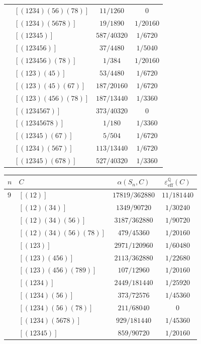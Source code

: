 \documentclass[12pt]{amsart}
\theoremstyle{definition} \newtheorem{definition}[theorem]{Definition}
\theoremstyle{example} \newtheorem{example}[theorem]{Example}
\theoremstyle{remark} \newtheorem{remark}{Remark}[theorem]
\numberwithin{equation}{section}
\numberwithin{theorem}{section}
\renewcommand{\epsilon}{\varepsilon}
\begin{document}
{\begin{table}[h]
\begin{minipage}[t]{0.45\textwidth}
\begin{tabular}{|l|l|c|c|}
					& $[(1234)(56)(78)]$ & $11/1260$ & $0$ \\
					& $[(1234)(5678)]$ & $19/1890$ & $1/20160$ \\
					& $[(12345)]$ & $587/40320$ & $1/6720$ \\
					& $[(123456)]$ & $37/4480$ & $1/5040$ \\
					& $[(123456)(78)]$ & $1/384$ & $1/20160$ \\
					& $[(123)(45)]$ & $53/4480$ & $1/6720$ \\
					& $[(123)(45)(67)]$ & $187/20160$ & $1/6720$ \\
					& $[(123)(456)(78)]$ & $187/13440$ & $1/3360$ \\
					& $[(1234567)]$ & $373/40320$ & $0$ \\
					& $[(12345678)]$ & $1/180$ & $1/3360$ \\
					& $[(12345)(67)]$ & $5/504$ & $1/6720$ \\
					& $[(1234)(567)]$ & $113/13440$ & $1/6720$ \\
					& $[(12345)(678)]$ & $527/40320$ & $1/3360$ \\
					\hline
		\end{tabular}
		\end{minipage}
		\begin{minipage}[t]{0.45\textwidth}
		\begin{tabular}{|l|l|c|c|} \hline
			$n$ & $C$ & $\alpha(S_n,C)$ & $\epsilon_\mathrm{eff}^\mathbb{Q}(C)$ \\ \hline
				$9$ & $[(12)]$ & $ 17819/362880$ & $11/181440$ \\
					& $[(12)(34)]$ & $1349/90720 $ & $1/30240 $\\
					& $[(12)(34)(56)]$ & $3187/362880 $ & $1/90720 $\\
					& $[(12)(34)(56)(78)]$ & $479/45360 $ & $1/20160 $\\
					& $[(123)]$ & $ 2971/120960$ & $ 1/60480$\\
					& $[(123)(456)]$ & $ 2113/362880 $ & $ 1/22680$\\
					& $[(123)(456)(789)]$ & $107/12960 $ & $ 1/20160$\\
					& $[(1234)]$ & $ 2449/181440$ & $1/25920 $\\
					& $[(1234)(56)]$ & $ 373/72576$ & $1/45360 $\\
					& $[(1234)(56)(78)]$ & $ 211/68040$ & $0$\\
					& $[(1234)(5678)]$ & $ 929/181440 $ & $1/45360 $\\
					& $[(12345)]$ & $ 859/90720$ & $1/20160 $\\

\end{tabular}
\end{minipage}
\end{table}}
\end{document}
